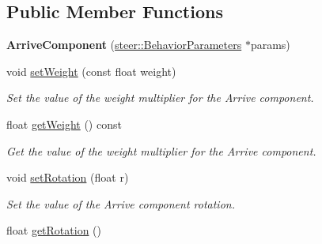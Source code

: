 \subsection*{Public Member Functions}
\begin{DoxyCompactItemize}
\item 
\hypertarget{classsteer_1_1_arrive_component_a8639213b1e9236016f870853aba5e9ea}{{\bfseries Arrive\-Component} (\hyperlink{structsteer_1_1_behavior_parameters}{steer\-::\-Behavior\-Parameters} $\ast$params)}\label{classsteer_1_1_arrive_component_a8639213b1e9236016f870853aba5e9ea}

\item 
void \hyperlink{classsteer_1_1_arrive_component_a181c718e442f1b94f7318c1ea04d21a7}{set\-Weight} (const float weight)
\begin{DoxyCompactList}\small\item\em Set the value of the weight multiplier for the Arrive component. \end{DoxyCompactList}\item 
\hypertarget{classsteer_1_1_arrive_component_a9dff419ecb7381ef3348431c745d6846}{float \hyperlink{classsteer_1_1_arrive_component_a9dff419ecb7381ef3348431c745d6846}{get\-Weight} () const }\label{classsteer_1_1_arrive_component_a9dff419ecb7381ef3348431c745d6846}

\begin{DoxyCompactList}\small\item\em Get the value of the weight multiplier for the Arrive component. \end{DoxyCompactList}\item 
\hypertarget{classsteer_1_1_arrive_component_aa0b020261892f45064b4b0a912832a20}{void \hyperlink{classsteer_1_1_arrive_component_aa0b020261892f45064b4b0a912832a20}{set\-Rotation} (float r)}\label{classsteer_1_1_arrive_component_aa0b020261892f45064b4b0a912832a20}

\begin{DoxyCompactList}\small\item\em Set the value of the Arrive component rotation. \end{DoxyCompactList}\item 
\hypertarget{classsteer_1_1_arrive_component_aafe66a1cd22027b633173f3f08a7d4cc}{float \hyperlink{classsteer_1_1_arrive_component_aafe66a1cd22027b633173f3f08a7d4cc}{get\-Rotation} ()}\label{classsteer_1_1_arrive_component_aafe66a1cd22027b633173f3f08a7d4cc}


\end{DoxyCompactItemize}

